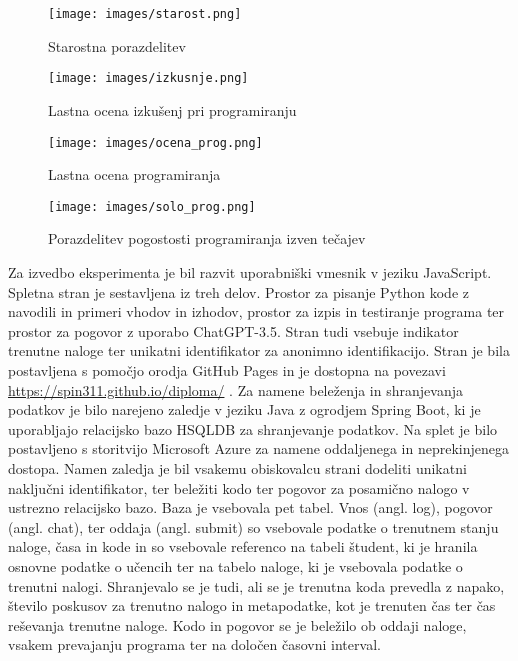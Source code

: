 \documentclass[a4paper,12pt,openright]{book}
\begin{document}
\begin{figure}[H]
    \centering
    \texttt{[image: images/starost.png]}
    \caption{Starostna porazdelitev}
    \label{fig:ages}
\end{figure}

\begin{figure}[H]
    \centering
    \texttt{[image: images/izkusnje.png]}
    \caption{Lastna ocena izkušenj pri programiranju}
    \label{fig:ages}
\end{figure}

\begin{figure}[H]
    \centering
    \texttt{[image: images/ocena\_prog.png]}
    \caption{Lastna ocena programiranja}
    \label{fig:ocena_prog}
\end{figure}

\begin{figure}[H]
    \centering
    \texttt{[image: images/solo\_prog.png]}
    \caption{Porazdelitev pogostosti programiranja izven tečajev}
    \label{fig:solo_prog}
\end{figure}



Za izvedbo eksperimenta je bil razvit uporabniški vmesnik v jeziku JavaScript. Spletna stran je sestavljena iz treh delov. Prostor za pisanje Python kode z navodili in primeri vhodov in izhodov, prostor za izpis in testiranje programa ter prostor za pogovor z uporabo ChatGPT-3.5. Stran tudi vsebuje indikator trenutne naloge ter unikatni identifikator za anonimno identifikacijo. Stran je bila postavljena s pomočjo orodja GitHub Pages in je dostopna na povezavi \href{https://spin311.github.io/diploma/}{ https://spin311.github.io/diploma/} .
Za namene beleženja in shranjevanja podatkov je bilo narejeno zaledje v jeziku Java z ogrodjem Spring Boot, ki je uporabljajo relacijsko bazo HSQLDB za shranjevanje podatkov. Na splet je bilo postavljeno s storitvijo Microsoft Azure za namene oddaljenega in neprekinjenega dostopa. Namen zaledja je bil vsakemu obiskovalcu strani dodeliti unikatni naključni identifikator, ter beležiti kodo ter pogovor za posamično nalogo v ustrezno relacijsko bazo. Baza je vsebovala pet tabel. Vnos (angl. log), pogovor (angl. chat), ter oddaja (angl. submit) so vsebovale podatke o trenutnem stanju naloge, časa in kode in so vsebovale referenco na tabeli študent, ki je hranila osnovne podatke o učencih ter na tabelo naloge, ki je vsebovala podatke o trenutni nalogi. Shranjevalo se je tudi, ali se je trenutna koda prevedla z napako, število poskusov za trenutno nalogo in metapodatke, kot je trenuten čas ter čas reševanja trenutne naloge. Kodo in pogovor se je beležilo ob oddaji naloge, vsakem prevajanju programa ter na določen časovni interval.
\end{document}
